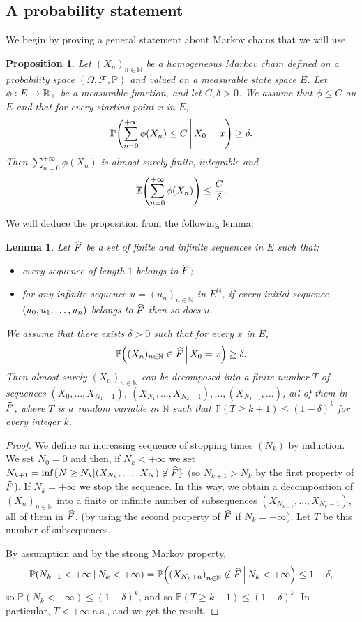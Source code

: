 \documentclass[10pt]{amsart}
\newtheorem{lemm}[theo]{Lemma}\newtheorem{prop}[theo]{Proposition}\newtheorem{coro}[theo]{Corollary}\newtheorem{conj}[theo]{Conjecture}
\theoremstyle{definition}\newtheorem{defi}[theo]{Definition}\newtheorem{rema}[theo]{Remark}\newtheorem{exam}[theo]{Example}\newtheorem{exem}[theo]{Example}\newtheorem{nota}[theo]{Notation}
\newcommand{\bbP}{\mathbb{P}}
\newcommand{\R}{\mathbb{R}}
\newcommand{\clF}{\mathcal{F}}
\newcommand{\N}{\mathbb{N}}
\newcommand{\E}{\mathbb{E}}
\renewcommand*{\to}{\mathchoice{\longrightarrow}{\rightarrow}{\rightarrow}{\rightarrow}}
\let\originalleft\left
\let\originalright\right
\renewcommand{\left}{\mathopen{}\mathclose\bgroup\originalleft}
\renewcommand{\right}{\aftergroup\egroup\originalright}
\let\oldhat\hat
\renewcommand*{\hat}[1]{\mathchoice{\widehat{#1}}{\widehat{#1}}{\oldhat{#1}}{\oldhat{#1}}}
\begin{document}
\subsection{A probability statement} We begin by proving a general statement about Markov chains that we will use.

\begin{prop}\label{Markovsum}
Let $(X_n)_{n\in\N}$ be a homogeneous Markov chain defined on a probability space $(\Omega,\clF,\bbP)$ and valued on a measurable state space $E$. Let $\phi:E\to \R_+$ be a measurable function, and let $C,\delta>0$. We assume that $\phi\leq C$ on $E$ and that for every starting point $x$ in $E$,
\[
\bbP\left(\sum_{n=0}^{+\infty}\phi(X_n)\leq C\,\middle|\,X_0=x\right)\geq \delta.
\]
Then $ \sum_{n=0}^{+\infty}\phi(X_n)$ is almost surely finite, integrable and
\[
\E\left(\sum_{n=0}^{+\infty}\phi(X_n)\right)\leq \frac{C}{\delta}.
\]
\end{prop}

We will deduce the proposition from the following lemma:

\begin{lemm}\label{Markovlemma}
Let $\hat{F}$ be a set of finite and infinite sequences in $E$ such that:
\begin{itemize}
\item every sequence of length $1$ belongs to $\hat{F}$;
\item for any infinite sequence $u=(u_n)_{n\in\N}$ in $E^\N$, if every initial sequence $(u_0,\linebreak u_1,\dots,u_n)$ belongs to $\hat{F}$ then so does $u$.
\end{itemize}
We assume that there exists $\delta>0$ such that for every $x$ in $E$,
\[
\bbP\left((X_n)_{n\in\N}\in \hat{F}\,\middle|\,X_0=x\right)\geq \delta.
\]
Then almost surely $(X_n)_{n\in\N}$ can be decomposed into a finite number $T$ of sequences $(X_0,\dots,X_{N_1-1})$, $(X_{N_1},\dots,X_{N_2-1}),\dots,(X_{N_{T-1}},\dots)$, all of them in $\hat{F}$, where $T$ is a~random variable in $\N$ such that $\bbP(T\geq k+1)\leq (1-\delta)^k$ for every integer $k$.
\end{lemm}
\begin{proof}
We define an increasing sequence of stopping times $(N_k)$ by induction. We set $N_0=0$ and then, if $N_k<+\infty$ we set $N_{k+1}=\inf\{N\geq N_k|(X_{N_k},\dots, X_N)\not\in \hat{F}\}$ (so $N_{k+1}>N_k$ by the first property of $\hat{F}$). If $N_k=+\infty$ we stop the sequence. In this way, we obtain a decomposition of $(X_n)_{n\in\N}$ into a finite or infinite number of subsequences $(X_{N_{k-1}},\dots, X_{N_k-1})$, all of them in $\hat{F}$. (by using the second property of $\hat{F}$ if $N_k=+\infty$). Let $T$ be this number of subsequences.

By assumption and by the strong Markov property,
\[
\bbP\left(N_{k+1}<+\infty\,\middle|\,N_k<+\infty\right)=\bbP\left(\left(X_{N_k+n}\right)_{n\in\N}\not\in \hat{F}\,\middle|\,N_k<+\infty\right)\leq 1-\delta,
\]
so $\bbP(N_k<+\infty)\leq (1-\delta)^k$, and so $\bbP(T\geq k+1)\leq (1-\delta)^k$. In particular, $T<+\infty$ a.s., and we get the result.
\end{proof}
\end{document}
